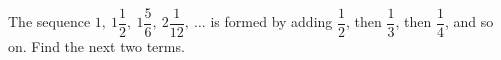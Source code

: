 The sequence $1,\ 1\dfrac{1}{2},\ 1\dfrac{5}{6},\ 2\dfrac{1}{12},\ \dots$ is formed by adding $\dfrac{1}{2}$, then $\dfrac{1}{3}$, then $\dfrac{1}{4}$, and so on. Find the next two terms.

